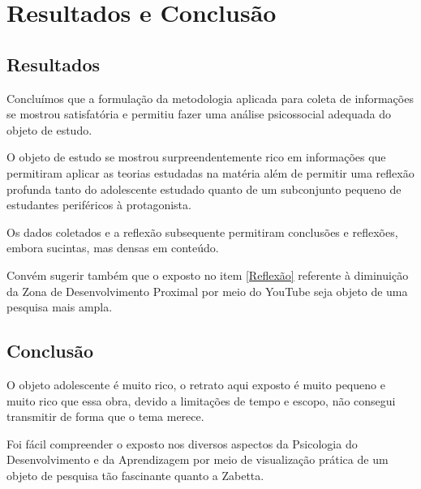 \chapter{Resultados e Conclusão}

\section{Resultados}

Concluímos que a formulação da metodologia aplicada para coleta de informações se mostrou satisfatória e permitiu fazer uma análise psicossocial adequada do objeto de estudo.

O objeto de estudo se mostrou surpreendentemente rico em informações que permitiram aplicar as teorias estudadas na matéria além de permitir uma reflexão profunda tanto do adolescente estudado quanto de um subconjunto pequeno de estudantes periféricos à protagonista.

Os dados coletados e a reflexão subsequente permitiram conclusões e reflexões, embora sucintas, mas densas em conteúdo.

Convém sugerir também que o exposto no item \ref{Reflexão} referente à diminuição da Zona de Desenvolvimento Proximal por meio do YouTube seja objeto de uma pesquisa mais ampla.

\section{Conclusão}

O objeto adolescente é muito rico, o retrato aqui exposto é muito pequeno e muito rico que essa obra, devido a limitações de tempo e escopo, não consegui transmitir de forma que o tema merece.

Foi fácil compreender o exposto nos diversos aspectos da Psicologia do Desenvolvimento e da Aprendizagem por meio de visualização prática de um objeto de pesquisa tão fascinante quanto a Zabetta.



